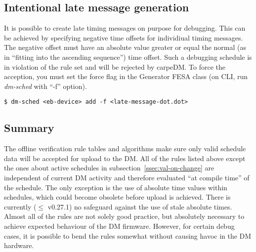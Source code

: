 \subsection{Intentional late message generation}
%
It is possible to create late timing messages on purpose for debugging. This can be achieved by specifying negative time offsets for individiual timing messages. The negative offset must have an absolute value greater or equal the normal (as in \enquote{fitting into the ascending sequence}) time offset. Such a debugging schedule is in violation of the rule set and will be rejected by carpeDM. To force the acception, you must set the force flag in the Generator FESA class (on CLI, run \emph{dm-sched} with \enquote{-f} option). 
\begin{lstlisting}[style = customshell]
$ dm-sched <eb-device> add -f <late-message-dot.dot>
\end{lstlisting}


\subsection{Summary}
The offline verification rule tables and algorithms make sure only valid schedule data will be accepted for upload to the DM. 
All of the rules listed above except the ones about active schedules in subsection~\ref{ssec:val-on-change} are independent of current DM activity and therefore evaluated \enquote{at compile time} of the schedule.
The only exception is the use of absolute time values within schedules, which could become obsolete before upload is achieved. There is currently ($\le$ v0.27.1) no safeguard against the use of stale absolute times.
Almost all of the rules are not solely good practice, but absolutely necessary to achieve expected behaviour of the DM firmware. However, for certain debug cases, it is possible to bend the rules somewhat without causing havoc in the DM hardware.


